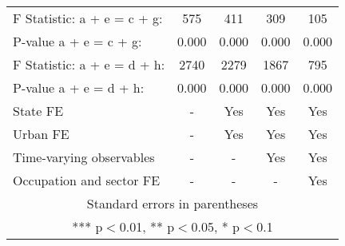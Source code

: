 \begin{tabular}{lcccc}
F Statistic: a + e = c  + g: & 575 & 411 & 309 & 105 \\
\hspace{1mm} P-value a + e = c + g: & 0.000 & 0.000 & 0.000 & 0.000 \\
F Statistic: a + e = d + h: & 2740 & 2279 & 1867 & 795 \\
\hspace{1mm} P-value a + e = d + h: & 0.000 & 0.000 & 0.000 & 0.000 \\
State FE & - & Yes & Yes & Yes \\
Urban FE & - & Yes & Yes & Yes \\
Time-varying observables & - & - & Yes & Yes \\
 Occupation and sector FE & - & - & - & Yes \\ \hline
\multicolumn{5}{c}{ Standard errors in parentheses} \\
\multicolumn{5}{c}{ *** p$<$0.01, ** p$<$0.05, * p$<$0.1} \\
\end{tabular}
